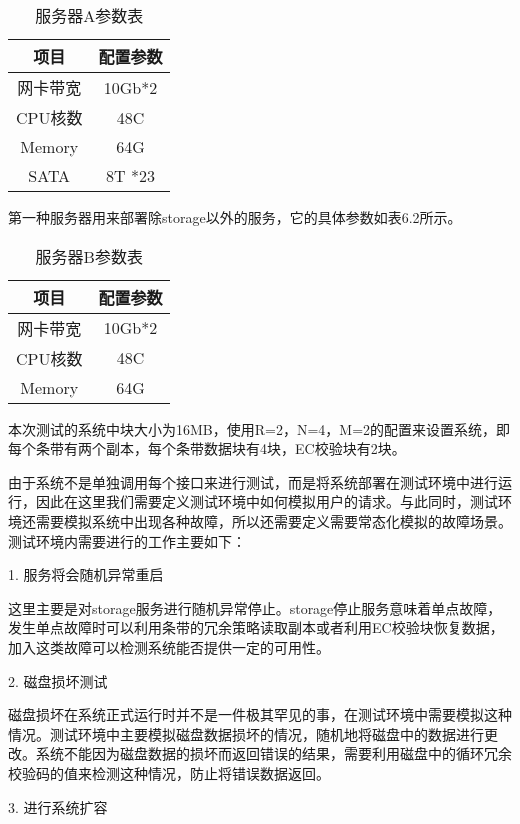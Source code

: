 \begin{table}[h]
    \centering
    \caption{服务器A参数表}
    \begin{tabular}{cc}
      \toprule
      项目   & 配置参数   \\
      \midrule
      网卡带宽  & 10Gb*2  \\
      CPU核数   & 48C     \\
      Memory   & 64G      \\
      SATA     & 8T *23   \\
      \bottomrule
    \end{tabular}
\end{table}

第一种服务器用来部署除storage以外的服务，它的具体参数如表6.2所示。

\begin{table}[h]
    \centering
    \caption{服务器B参数表}
    \begin{tabular}{cc}
      \toprule
      项目   & 配置参数   \\
      \midrule
      网卡带宽  & 10Gb*2  \\
      CPU核数   & 48C     \\
      Memory   & 64G      \\
      \bottomrule
    \end{tabular}
\end{table}

本次测试的系统中块大小为16MB，使用R=2，N=4，M=2的配置来设置系统，即每个条带有两个副本，每个条带数据块有4块，EC校验块有2块。

由于系统不是单独调用每个接口来进行测试，而是将系统部署在测试环境中进行运行，因此在这里我们需要定义测试环境中如何模拟用户的请求。与此同时，测试环境还需要模拟系统中出现各种故障，所以还需要定义需要常态化模拟的故障场景。测试环境内需要进行的工作主要如下：

1. 服务将会随机异常重启

这里主要是对storage服务进行随机异常停止。storage停止服务意味着单点故障，发生单点故障时可以利用条带的冗余策略读取副本或者利用EC校验块恢复数据，加入这类故障可以检测系统能否提供一定的可用性。

2. 磁盘损坏测试

磁盘损坏在系统正式运行时并不是一件极其罕见的事，在测试环境中需要模拟这种情况。测试环境中主要模拟磁盘数据损坏的情况，随机地将磁盘中的数据进行更改。系统不能因为磁盘数据的损坏而返回错误的结果，需要利用磁盘中的循环冗余校验码的值来检测这种情况，防止将错误数据返回。

3. 进行系统扩容

